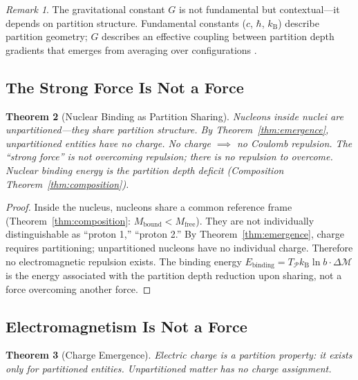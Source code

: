 \documentclass[11pt,twocolumn,a4paper]{article}
\newtheorem{theorem}{Theorem}[section]
\theoremstyle{definition}
\theoremstyle{remark}
\newtheorem{remark}[theorem]{Remark}
\newcommand{\kB}{k_{\mathrm{B}}}
\newcommand{\Depth}{\mathcal{M}}
\newcommand{\Mfree}{M_{\mathrm{free}}}
\newcommand{\Mbound}{M_{\mathrm{bound}}}
\begin{document}
\begin{remark}
The gravitational constant $G$ is not fundamental but contextual---it depends on partition structure. Fundamental constants ($c$, $\hbar$, $\kB$) describe partition geometry; $G$ describes an effective coupling between partition depth gradients that emerges from averaging over configurations \citep{einstein1916, eotvos1922}.
\end{remark}

\subsection{The Strong Force Is Not a Force}

\begin{theorem}[Nuclear Binding as Partition Sharing]
\label{thm:strong}
Nucleons inside nuclei are unpartitioned---they share partition structure. By Theorem~\ref{thm:emergence}, unpartitioned entities have no charge. No charge $\implies$ no Coulomb repulsion. The ``strong force'' is not overcoming repulsion; there is no repulsion to overcome. Nuclear binding energy is the partition depth deficit (Composition Theorem~\ref{thm:composition}).
\end{theorem}

\begin{proof}
Inside the nucleus, nucleons share a common reference frame (Theorem~\ref{thm:composition}: $\Mbound < \Mfree$). They are not individually distinguishable as ``proton 1,'' ``proton 2.'' By Theorem~\ref{thm:emergence}, charge requires partitioning; unpartitioned nucleons have no individual charge. Therefore no electromagnetic repulsion exists. The binding energy $E_{\mathrm{binding}} = T_{\mathcal{P}}\kB\ln b \cdot \Delta\Depth$ is the energy associated with the partition depth reduction upon sharing, not a force overcoming another force.
\end{proof}

\subsection{Electromagnetism Is Not a Force}

\begin{theorem}[Charge Emergence]
\label{thm:charge}
Electric charge is a partition property: it exists only for partitioned entities. Unpartitioned matter has no charge assignment.
\end{theorem}
\end{document}
